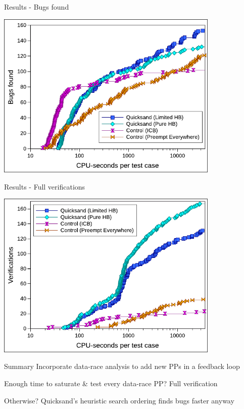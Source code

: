 \documentclass[xcolor=dvipsnames]{beamer}
\begin{document}
\begin{frame}{Results - Bugs found}
	\begin{center}
		\includegraphics[width=0.8\textwidth]{../../oopsla/bugs-talk.pdf}
	\end{center}
\end{frame}
\begin{frame}{Results - Full verifications}
	\begin{center}
		\includegraphics[width=0.8\textwidth]{../../oopsla/verifs-talk.pdf}
	\end{center}
\end{frame}

\begin{frame}{Summary}
	Incorporate data-race analysis to add new PPs in a feedback loop
	\linegap

	Enough time to saturate \& test every data-race PP? Full verification
	\linegap

	Otherwise? Quicksand's heuristic search ordering finds bugs faster anyway
	\pause
	\linegap

\end{frame}
\end{document}
